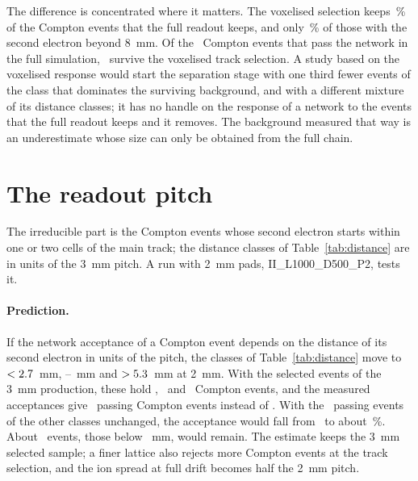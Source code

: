 \documentclass[11pt,a4paper]{article}
\begin{document}
The difference is concentrated where it matters. The voxelised selection keeps
\VoxComptKeptFrac\,\% of the Compton events that the full readout keeps, and
only \VoxDistCKept\,\% of those with the second electron beyond 8~mm. Of the
\ComptPassed\ Compton events that pass the network in the full simulation,
\VoxComptPassKept\ survive the voxelised track selection. A study based on the
voxelised response would start the separation stage with one third fewer
events of the class that dominates the surviving background, and with a
different mixture of its distance classes; it has no handle on the response
of a network to the events that the full readout keeps and it removes. The
background measured that way is an underestimate whose size can only be
obtained from the full chain.

\section{The readout pitch}
\label{sec:pitch}
The irreducible part is the Compton events whose second electron starts
within one or two cells of the main track; the distance classes of
Table~\ref{tab:distance} are in units of the 3~mm pitch. A run with 2~mm pads,
II\_L1000\_D500\_P2, tests it.

\paragraph{Prediction.} If the network acceptance of a Compton event depends
on the distance of its second electron in units of the pitch, the classes
of Table~\ref{tab:distance} move to $<2.7$~mm,
\PitchEdgeOne--\PitchEdgeTwo~mm and $>5.3$~mm at 2~mm. With the
selected events of the 3~mm production, these hold \PitchDistAEvents,
\PitchDistBEvents\ and \PitchDistCEvents\ Compton events, and the measured
acceptances give \PitchComptPassed\ passing Compton events instead of
\ComptPassed. With the \PitchOthers\ passing events of the other classes
unchanged, the \BI acceptance would fall from \BiNet\ to about \PitchTotalNet\,\%.
About \PitchIrreducible\ events, those below \PitchEdgeOne~mm, would remain.
The estimate keeps the 3~mm selected sample; a finer lattice also rejects more
Compton events at the track selection, and the ion spread at full drift
becomes half the 2~mm pitch.
\end{document}
